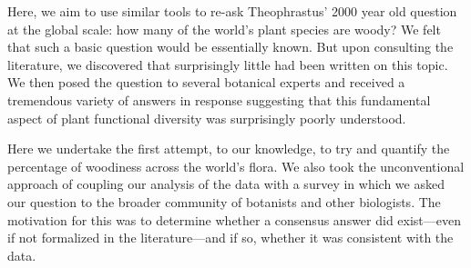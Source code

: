 \documentclass[12pt]{article}
\begin{document}
% 
Here, we aim to use similar tools to re-ask Theophrastus' 2000 year
old question at the global scale: how many of the world's plant
species are woody?
% 
We felt that such a basic question would be essentially known.  But
upon consulting the literature, we discovered that surprisingly little
had been written on this topic. We then posed the question to several
botanical experts and received a tremendous variety of answers in
response suggesting that this fundamental aspect of plant functional
diversity was surprisingly poorly understood. 

Here we undertake the first attempt, to our knowledge, to try and
quantify the percentage of woodiness across the world's flora. We also
took the unconventional approach of coupling our analysis of the data
with a survey in which we asked our question to the broader community
of botanists and other biologists. The motivation for this was to
determine whether a consensus answer did exist---even if not
formalized in the literature---and if so, whether it was consistent
with the data.


\end{document}
